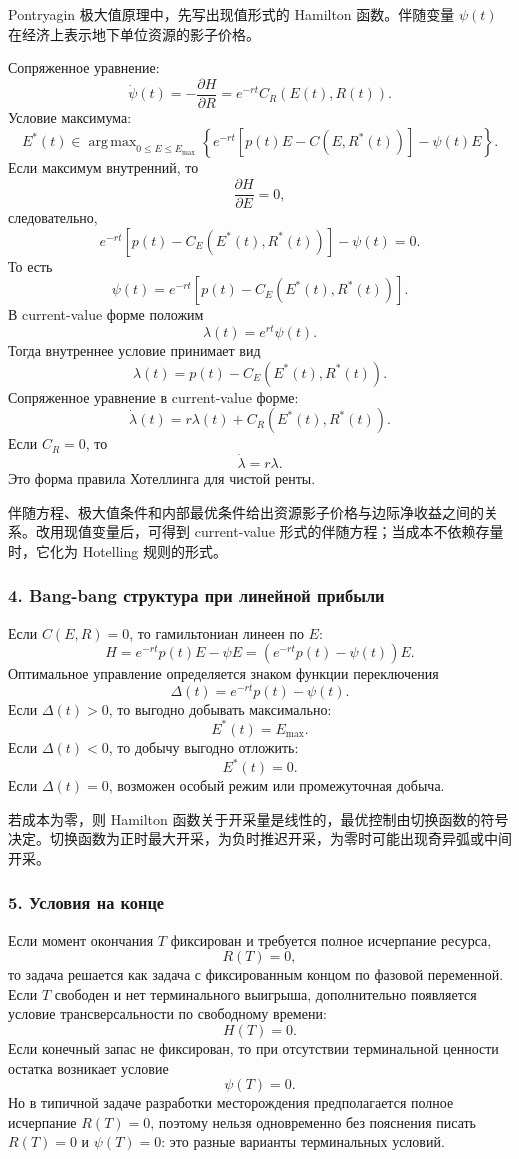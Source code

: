 \documentclass[12pt,a4paper]{article}
\DeclareMathOperator*{\argmax}{arg\,max}
\newcommand{\zh}[1]{\par\noindent #1\par}
\begin{document}
\zh{Pontryagin 极大值原理中，先写出现值形式的 Hamilton 函数。伴随变量 $\psi(t)$ 在经济上表示地下单位资源的影子价格。}

Сопряженное уравнение:
\[
\dot\psi(t)=-\frac{\partial H}{\partial R}=e^{-rt}C_R(E(t),R(t)).
\]
Условие максимума:
\[
E^*(t)\in \argmax_{0\le E\le E_{\max}}\left\{e^{-rt}[p(t)E-C(E,R^*(t))]-\psi(t)E\right\}.
\]
Если максимум внутренний, то
\[
\frac{\partial H}{\partial E}=0,
\]
следовательно,
\[
e^{-rt}\left[p(t)-C_E(E^*(t),R^*(t))\right]-\psi(t)=0.
\]
То есть
\[
\psi(t)=e^{-rt}\left[p(t)-C_E(E^*(t),R^*(t))\right].
\]
В current-value форме положим
\[
\lambda(t)=e^{rt}\psi(t).
\]
Тогда внутреннее условие принимает вид
\[
\lambda(t)=p(t)-C_E(E^*(t),R^*(t)).
\]
Сопряженное уравнение в current-value форме:
\[
\dot\lambda(t)=r\lambda(t)+C_R(E^*(t),R^*(t)).
\]
Если $C_R=0$, то
\[
\dot\lambda=r\lambda.
\]
Это форма правила Хотеллинга для чистой ренты.

\zh{伴随方程、极大值条件和内部最优条件给出资源影子价格与边际净收益之间的关系。改用现值变量后，可得到 current-value 形式的伴随方程；当成本不依赖存量时，它化为 Hotelling 规则的形式。}

\subsubsection*{4. Bang-bang структура при линейной прибыли}
Если $C(E,R)=0$, то гамильтониан линеен по $E$:
\[
H=e^{-rt}p(t)E-\psi E=(e^{-rt}p(t)-\psi(t))E.
\]
Оптимальное управление определяется знаком функции переключения
\[
\Delta(t)=e^{-rt}p(t)-\psi(t).
\]
Если $\Delta(t)>0$, то выгодно добывать максимально:
\[
E^*(t)=E_{\max}.
\]
Если $\Delta(t)<0$, то добычу выгодно отложить:
\[
E^*(t)=0.
\]
Если $\Delta(t)=0$, возможен особый режим или промежуточная добыча.

\zh{若成本为零，则 Hamilton 函数关于开采量是线性的，最优控制由切换函数的符号决定。切换函数为正时最大开采，为负时推迟开采，为零时可能出现奇异弧或中间开采。}

\subsubsection*{5. Условия на конце}
Если момент окончания $T$ фиксирован и требуется полное исчерпание ресурса,
\[
R(T)=0,
\]
то задача решается как задача с фиксированным концом по фазовой переменной. Если $T$ свободен и нет терминального выигрыша, дополнительно появляется условие трансверсальности по свободному времени:
\[
H(T)=0.
\]
Если конечный запас не фиксирован, то при отсутствии терминальной ценности остатка возникает условие
\[
\psi(T)=0.
\]
Но в типичной задаче разработки месторождения предполагается полное исчерпание $R(T)=0$, поэтому нельзя одновременно без пояснения писать $R(T)=0$ и $\psi(T)=0$: это разные варианты терминальных условий.
\end{document}
